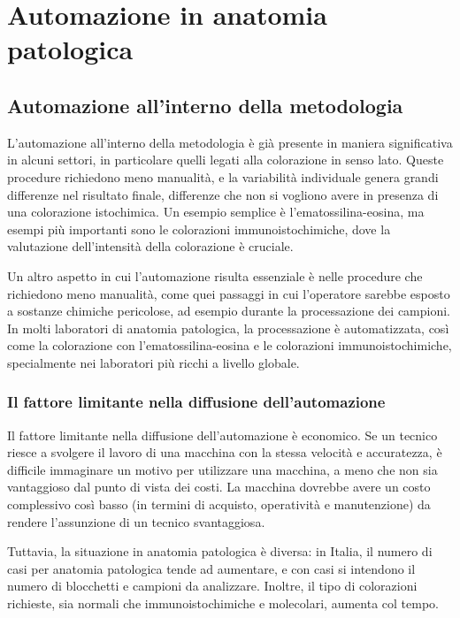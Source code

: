 \chapter{Automazione in anatomia patologica}


\section{Automazione all'interno della metodologia}

L'automazione all'interno della metodologia è già presente in maniera significativa in alcuni settori, in particolare quelli legati alla colorazione in senso lato. Queste procedure richiedono meno manualità, e la variabilità individuale genera grandi differenze nel risultato finale, differenze che non si vogliono avere in presenza di una colorazione istochimica. Un esempio semplice è l'ematossilina-eosina, ma esempi più importanti sono le colorazioni immunoistochimiche, dove la valutazione dell'intensità della colorazione è cruciale.

Un altro aspetto in cui l'automazione risulta essenziale è nelle procedure che richiedono meno manualità, come quei passaggi in cui l'operatore sarebbe esposto a sostanze chimiche pericolose, ad esempio durante la processazione dei campioni. In molti laboratori di anatomia patologica, la processazione è automatizzata, così come la colorazione con l'ematossilina-eosina e le colorazioni immunoistochimiche, specialmente nei laboratori più ricchi a livello globale.

\subsection{Il fattore limitante nella diffusione dell'automazione}

Il fattore limitante nella diffusione dell'automazione è economico. Se un tecnico riesce a svolgere il lavoro di una macchina con la stessa velocità e accuratezza, è difficile immaginare un motivo per utilizzare una macchina, a meno che non sia vantaggioso dal punto di vista dei costi. La macchina dovrebbe avere un costo complessivo così basso (in termini di acquisto, operatività e manutenzione) da rendere l'assunzione di un tecnico svantaggiosa.

Tuttavia, la situazione in anatomia patologica è diversa: in Italia, il numero di casi per anatomia patologica tende ad aumentare, e con casi si intendono il numero di blocchetti e campioni da analizzare. Inoltre, il tipo di colorazioni richieste, sia normali che immunoistochimiche e molecolari, aumenta col tempo.

